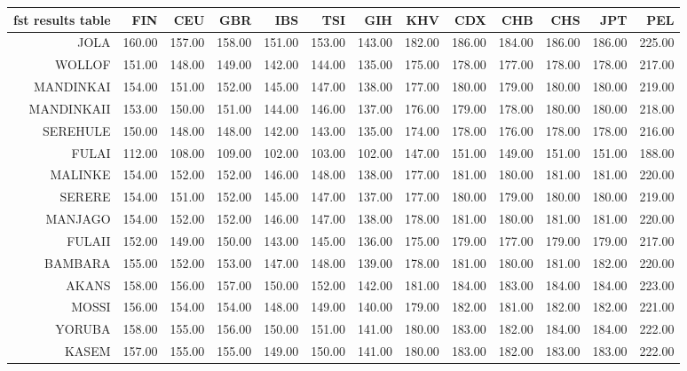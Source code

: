 \begin{longtable}{rrrrrrrrrrrrr}
  fst results table \toprule
 & FIN & CEU & GBR & IBS & TSI & GIH & KHV & CDX & CHB & CHS & JPT & PEL \\ 
  \midrule
JOLA & 160.00 & 157.00 & 158.00 & 151.00 & 153.00 & 143.00 & 182.00 & 186.00 & 184.00 & 186.00 & 186.00 & 225.00 \\ 
  WOLLOF & 151.00 & 148.00 & 149.00 & 142.00 & 144.00 & 135.00 & 175.00 & 178.00 & 177.00 & 178.00 & 178.00 & 217.00 \\ 
  MANDINKAI & 154.00 & 151.00 & 152.00 & 145.00 & 147.00 & 138.00 & 177.00 & 180.00 & 179.00 & 180.00 & 180.00 & 219.00 \\ 
  MANDINKAII & 153.00 & 150.00 & 151.00 & 144.00 & 146.00 & 137.00 & 176.00 & 179.00 & 178.00 & 180.00 & 180.00 & 218.00 \\ 
  SEREHULE & 150.00 & 148.00 & 148.00 & 142.00 & 143.00 & 135.00 & 174.00 & 178.00 & 176.00 & 178.00 & 178.00 & 216.00 \\ 
  FULAI & 112.00 & 108.00 & 109.00 & 102.00 & 103.00 & 102.00 & 147.00 & 151.00 & 149.00 & 151.00 & 151.00 & 188.00 \\ 
  MALINKE & 154.00 & 152.00 & 152.00 & 146.00 & 148.00 & 138.00 & 177.00 & 181.00 & 180.00 & 181.00 & 181.00 & 220.00 \\ 
  SERERE & 154.00 & 151.00 & 152.00 & 145.00 & 147.00 & 137.00 & 177.00 & 180.00 & 179.00 & 180.00 & 180.00 & 219.00 \\ 
  MANJAGO & 154.00 & 152.00 & 152.00 & 146.00 & 147.00 & 138.00 & 178.00 & 181.00 & 180.00 & 181.00 & 181.00 & 220.00 \\ 
  FULAII & 152.00 & 149.00 & 150.00 & 143.00 & 145.00 & 136.00 & 175.00 & 179.00 & 177.00 & 179.00 & 179.00 & 217.00 \\ 
  BAMBARA & 155.00 & 152.00 & 153.00 & 147.00 & 148.00 & 139.00 & 178.00 & 181.00 & 180.00 & 181.00 & 182.00 & 220.00 \\ 
   \hline 
AKANS & 158.00 & 156.00 & 157.00 & 150.00 & 152.00 & 142.00 & 181.00 & 184.00 & 183.00 & 184.00 & 184.00 & 223.00 \\ 
  MOSSI & 156.00 & 154.00 & 154.00 & 148.00 & 149.00 & 140.00 & 179.00 & 182.00 & 181.00 & 182.00 & 182.00 & 221.00 \\ 
  YORUBA & 158.00 & 155.00 & 156.00 & 150.00 & 151.00 & 141.00 & 180.00 & 183.00 & 182.00 & 184.00 & 184.00 & 222.00 \\ 
  KASEM & 157.00 & 155.00 & 155.00 & 149.00 & 150.00 & 141.00 & 180.00 & 183.00 & 182.00 & 183.00 & 183.00 & 222.00 \\ 

\end{longtable}
